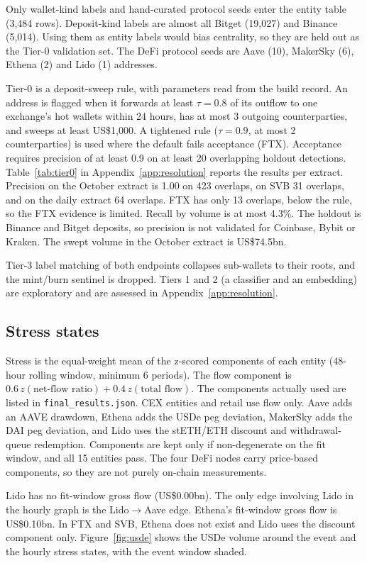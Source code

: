 \documentclass[referee,pdflatex,sn-mathphys-ay]{sn-jnl}
\theoremstyle{thmstyleone}%
\theoremstyle{thmstyletwo}%
\theoremstyle{thmstylethree}%
\begin{document}
Only wallet-kind labels and hand-curated protocol seeds enter the entity table (3{,}484 rows).
Deposit-kind labels are almost all Bitget (19{,}027) and Binance (5{,}014). Using them as entity
labels would bias centrality, so they are held out as the Tier-0 validation set. The DeFi protocol seeds are
Aave (10), MakerSky (6), Ethena (2) and Lido (1) addresses.

Tier-0 is a deposit-sweep rule, with parameters read from the build record. An address is flagged when it
forwards at least $\tau=0.8$ of its outflow to one exchange's hot wallets within 24 hours, has at most
3 outgoing counterparties, and sweeps at least US\$1{,}000. A tightened rule
($\tau=0.9$, at most 2 counterparties) is used where the default fails acceptance (FTX).
Acceptance requires precision of at least 0.9 on at least 20 overlapping holdout detections. Table~\ref{tab:tier0}
in Appendix~\ref{app:resolution} reports the results per extract. Precision on the October extract is
1.00 on 423 overlaps, on SVB 31 overlaps, and on the daily extract
64 overlaps. FTX has only 13 overlaps, below the rule, so the FTX evidence is limited.
Recall by volume is at most 4.3\%. The holdout is Binance and Bitget deposits, so precision is not validated for
Coinbase, Bybit or Kraken. The swept volume in the October extract is US\$74.5bn.

Tier-3 label matching of both endpoints collapses sub-wallets to their roots, and the mint/burn sentinel is dropped.
Tiers 1 and 2 (a classifier and an embedding) are exploratory and are assessed in Appendix~\ref{app:resolution}.

\subsection{Stress states}
\label{subsec:stress}
Stress is the equal-weight mean of the z-scored components of each entity (48-hour rolling window, minimum 6
periods). The flow component is $0.6\,z(\text{net-flow ratio})+0.4\,z(\text{total flow})$. The components actually used are listed in
\texttt{final\_results.json}. CEX entities and retail use flow only. Aave adds an AAVE drawdown, Ethena adds
the USDe peg deviation, MakerSky adds the DAI peg deviation, and Lido uses the stETH/ETH discount and withdrawal-queue
redemption. Components are kept only if non-degenerate on the fit window, and all 15 entities pass.
The four DeFi nodes carry price-based components, so they are not purely on-chain measurements.

Lido has no fit-window gross flow (US\$0.00bn). The only edge involving Lido in the hourly graph is the
Lido$\to$Aave edge. Ethena's fit-window gross flow is US\$0.10bn. In FTX and SVB, Ethena does not exist
and Lido uses the discount component only. Figure~\ref{fig:usde} shows the USDe volume around the event and the
hourly stress states, with the event window shaded.
\end{document}
